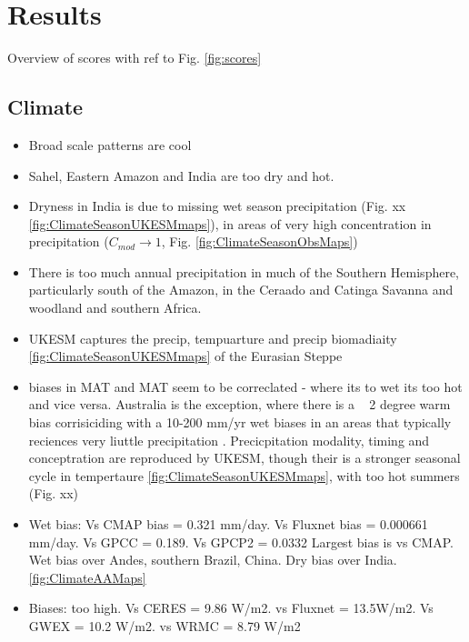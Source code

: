 \section{Results}
Overview of scores with ref to Fig. \ref{fig:scores}

\subsection{Climate}
\begin{itemize}
    \item Broad scale patterns are cool
    \item Sahel, Eastern Amazon and India are too dry and hot.
    \item Dryness in India is due to missing wet season precipitation (Fig. xx \ref{fig:ClimateSeasonUKESMmaps}), in areas of very high concentration in precipitation ($C_{mod} \rightarrow 1$, Fig. \ref{fig:ClimateSeasonObsMaps}) 
    \item There is too much annual precipitation in much of the Southern Hemisphere, particularly south of the Amazon, in the Ceraado and Catinga Savanna and woodland and southern Africa.
    \item UKESM captures the precip, tempuarture \label{fig:ClimateAAMaps} and precip biomadiaity \ref{fig:ClimateSeasonUKESMmaps} of the Eurasian Steppe
    \item biases in MAT and MAT seem to be correclated - where its to wet its too hot and vice versa. Australia is the exception, where there is a ~ 2 degree warm bias corrisiciding with a 10-200 mm/yr wet biases in an areas that typically reciences very liuttle precipitation \label{fig:ClimateAAMaps}. Precicpitation modality, timing and conceptration are reproduced by UKESM, though their is a stronger seasonal cycle in tempertaure \ref{fig:ClimateSeasonUKESMmaps}, with too hot summers (Fig. xx)
\end{itemize}

\begin{itemize}
    \item{Wet bias: Vs CMAP bias = 0.321 mm/day. Vs Fluxnet bias = 0.000661 mm/day. Vs GPCC = 0.189. Vs GPCP2 = 0.0332
Largest bias is vs CMAP. Wet bias over Andes, southern Brazil, China. Dry bias over India. \ref{fig:ClimateAAMaps}}
    \item Biases: too high. Vs CERES = 9.86 W/m2. vs Fluxnet = 13.5W/m2. Vs GWEX = 10.2 W/m2. vs WRMC = 8.79 W/m2
\end{itemize}

